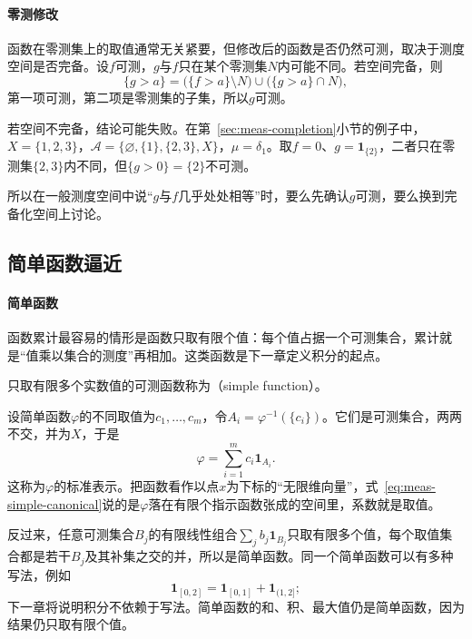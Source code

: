 \paragraph{零测修改}
函数在零测集上的取值通常无关紧要，但修改后的函数是否仍然可测，取决于测度空间是否完备。设$f$可测，$g$与$f$只在某个零测集$N$内可能不同。若空间完备，则
\[
 \{g>a\}=\bigl(\{f>a\}\setminus N\bigr)\cup\bigl(\{g>a\}\cap N\bigr),
\]
第一项可测，第二项是零测集的子集，所以$g$可测。

若空间不完备，结论可能失败。在第~\ref{sec:meas-completion}小节的例子中，$X=\{1,2,3\}$，$\mathcal A=\{\varnothing,\{1\},\{2,3\},X\}$，$\mu=\delta_1$。取$f=0$、$g=\mathbf 1_{\{2\}}$，二者只在零测集$\{2,3\}$内不同，但$\{g>0\}=\{2\}$不可测。

所以在一般测度空间中说“$g$与$f$几乎处处相等”时，要么先确认$g$可测，要么换到完备化空间上讨论。

\subsection{简单函数逼近}
\label{sec:meas-simple-approximation}

\paragraph{简单函数}
函数累计最容易的情形是函数只取有限个值：每个值占据一个可测集合，累计就是“值乘以集合的测度”再相加。这类函数是下一章定义积分的起点。

\begin{definition}[简单函数]
\label{def:meas-simple-function}
只取有限多个实数值的可测函数称为（simple function）。
\end{definition}

设简单函数$\varphi$的不同取值为$c_1,\dots,c_m$，令$A_i=\varphi^{-1}(\{c_i\})$。它们是可测集合，两两不交，并为$X$，于是
\begin{equation}
 \varphi=\sum_{i=1}^mc_i\mathbf 1_{A_i}.
 \label{eq:meas-simple-canonical}
\end{equation}
这称为$\varphi$的标准表示。把函数看作以点$x$为下标的“无限维向量”，式~\eqref{eq:meas-simple-canonical}说的是$\varphi$落在有限个指示函数张成的空间里，系数就是取值。

反过来，任意可测集合$B_j$的有限线性组合$\sum_jb_j\mathbf 1_{B_j}$只取有限多个值，每个取值集合都是若干$B_j$及其补集之交的并，所以是简单函数。同一个简单函数可以有多种写法，例如
\[
 \mathbf 1_{[0,2]}=\mathbf 1_{[0,1]}+\mathbf 1_{(1,2]};
\]
下一章将说明积分不依赖于写法。简单函数的和、积、最大值仍是简单函数，因为结果仍只取有限个值。

